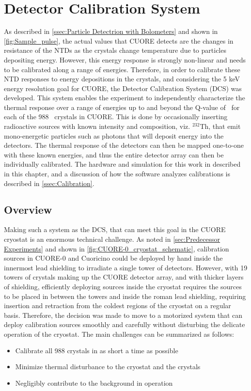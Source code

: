 \chapter{Detector Calibration System}
\label{chap:DCS}

As described in \autoref{ssec:Particle Detectrion with Bolometers} and shown in \autoref{fig:Sample_pulse}, the actual values that CUORE detects are the changes in resistance of the NTDs as the crystals change temperature due to particles depositing energy.
However, this energy response is strongly non-linear and needs to be calibrated along a range of energies.
Therefore, in order to calibrate these NTD responses to energy depositions in the crystals, and considering the 5 keV energy resolution goal for CUORE, the Detector Calibration System (DCS) was developed.
This system enables the experiment to independently characterize the thermal response over a range of energies up to and beyond the Q-value of \zeronubb~for each of the 988 \teotwo~crystals in CUORE.
This is done by occasionally inserting radioactive sources with known intensity and composition, viz. $^{232}$Th, that emit mono-energetic particles such as photons that will deposit energy into the detectors.
The thermal response of the detectors can then be mapped one-to-one with these known energies, and thus the entire detector array can then be individually calibrated. The hardware and simulation for this work in described in this chapter, and a discussion of how the software analyzes calibrations is described in \autoref{ssec:Calibration}.

\section{Overview}

Making such a system as the DCS, that can meet this goal in the CUORE cryostat is an enormous technical challenge.
As noted in \autoref{sec:Predecessor Experiments} and shown in \autoref{fig:CUORE-0_cryostat_schematic}, calibration sources in CUORE-0 and Cuoricino could be deployed by hand inside the innermost lead shielding to irradiate a single tower of detectors.
However, with 19 towers of crystals making up the CUORE detector array, and with thicker layers of shielding, efficiently deploying sources inside the cryostat requires the sources to be placed in between the towers and inside the roman lead shielding, requiring insertion and retraction from the coldest regions of the cryostat on a regular basis.
Therefore, the decision was made to move to a motorized system that can deploy calibration sources smoothly and carefully without disturbing the delicate operation of the cryostat.
The main challenges can be summarized as follows: 
\begin{itemize}
\item Calibrate all 988 crystals in as short a time as possible
\item Minimize thermal disturbance to the cryostat and the crystals
\item Negligibly contribute to the background in operation
\end{itemize}

